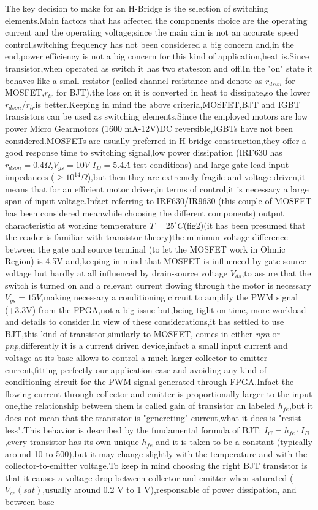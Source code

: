 The key decision to make for an H-Bridge is the selection of switching elements.Main factors that has affected the components choice are the operating current and the operating voltage;since the main aim is not an accurate speed control,switching frequency has not been considered a big concern and,in the end,power efficiency is not a big concern for this kind of application,heat is.Since transistor,when operated as switch it has two states:on and off.In the "on" state it behaves like a small resistor (called channel resistance and denote as $ r_{dson} $ for MOSFET,$ r_{tr} $ for BJT),the loss on it is converted in heat to dissipate,so the lower $ r_{dson} $/$ r_{tr} $is better.Keeping in mind the above criteria,MOSFET,BJT and IGBT transistors can be used as switching elements.Since the employed motors are low power Micro Gearmotors (1600 mA-12V)DC reversible,IGBTs have not been considered.MOSFETs are usually preferred in H-bridge construction,they offer a good response time to switching signal,low power dissipation (IRF630 has $ r_{dson}=0.4\Omega $,$ V_{gs}=10V $-$ I_{D}=5.4A $ test conditions) and large gate lead input impedances ($\geq10^{14}\Omega$),but then they are extremely fragile and voltage driven,it means that for an efficient motor driver,in terms of control,it is necessary a large span of input voltage.Infact referring to IRF630/IR9630 (this couple of MOSFET has been considered meanwhile choosing the different components) output characteristic at working temperature $ T=25^\circ C $(fig2)(it has been presumed that the reader is familiar with transistor theory)the minimun voltage difference between the gate and source terminal (to let the MOSFET work in Ohmic Region) is 4.5V and,keeping in mind that MOSFET is influenced by gate-source voltage but hardly at all influenced by drain-source voltage $ V_{ds} $,to assure that the switch is turned on and a relevant current flowing through the motor is necessary $ V_{gs}=15V $,making necessary a conditioning circuit to amplify the PWM signal (+3.3V) from the FPGA,not a big issue but,being tight on time, more workload and details to consider.In view of these considerations,it has settled to use BJT,this kind of transistor,similarly to MOSFET, comes in either \emph{npn} or \emph{pnp},differently it is a current driven device,infact a small input current and voltage at its base allows to control a much larger collector-to-emitter current,fitting perfectly our application case and avoiding any kind of conditioning circuit for the PWM signal generated through FPGA.Infact the flowing current through collector and emitter is proportionally larger to the input one,the relationship between them is called gain of transistor an labeled $h_{fe}$,but it does not mean that the transistor is "genereting" current,what it does is "resist less".This behavior is described by the fundamental formula of BJT: $I_C=h_{fe}\cdot I_B$,every transistor has its own unique $h_{fe}$ and it is taken to be a constant (typically around 10 to 500),but it may change slightly with the temperature and with the collector-to-emitter voltage.To keep in mind choosing the right BJT transistor is that it causes a voltage drop between collector and emitter when saturated ($V_{ce}(sat)$,usually around 0.2 V to 1 V),responsable of power dissipation, and between base 
